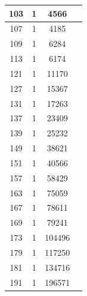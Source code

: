 \documentclass[11pt]{article}
\begin{document}
\begin{table}[htbp]
{\begin{tabular}{|c|c|c|c|}
103       &1         &4566     \\\hline
107       &1         &4185     \\\hline
109       &1         &6284     \\\hline
113       &1         &6174     \\\hline
121       &1         &11170    \\\hline
127       &1         &15367    \\\hline
131       &1         &17263    \\\hline
137       &1         &23409    \\\hline
139       &1         &25232    \\\hline
149       &1         &38621    \\\hline
151       &1         &40566    \\\hline
157       &1         &58429    \\\hline
163       &1         &75059    \\\hline
167       &1         &78611    \\\hline
169       &1         &79241    \\\hline
173       &1         &104496   \\\hline
179       &1         &117250   \\\hline
181       &1         &134716   \\\hline
191       &1         &196571   \\\hline
\end{tabular}
}
\end{table}
\end{document}
